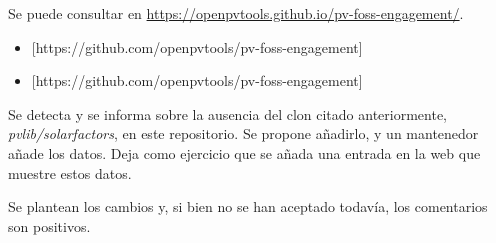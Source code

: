 Se puede consultar en \url{https://openpvtools.github.io/pv-foss-engagement/}.

\begin{itemize}
    \item {}[https://github.com/openpvtools/pv-foss-engagement]
    \item {}[https://github.com/openpvtools/pv-foss-engagement]
\end{itemize}

Se detecta y se informa sobre la ausencia del clon citado anteriormente, \textit{pvlib/solarfactors}, en este repositorio. Se propone añadirlo, y un mantenedor añade los datos. Deja como ejercicio que se añada una entrada en la web que muestre estos datos.

Se plantean los cambios y, si bien no se han aceptado todavía, los comentarios son positivos.
